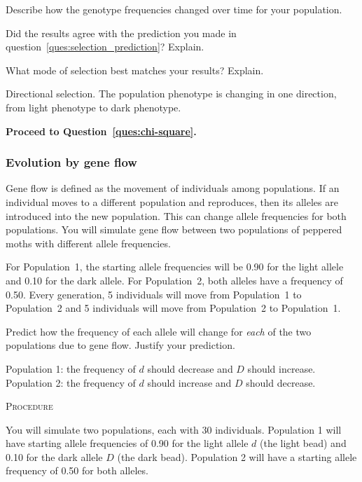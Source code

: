 \documentclass[12pt, hidelinks]{exam}
\newcommand*\AnswerBox[2]{%
    \parbox[t][#1]{0.92\textwidth}{%
    \begin{solution}#2\end{solution}}
    \vspace{\stretch{1}}
}
\newlength{\basespace}
\newcommand{\allele}[1]{$#1$}
\begin{document}
\begin{questions}

\question
Describe how the genotype frequencies changed over time for your population.

\AnswerBox{0.5\basespace}{%
}

\question
Did the results agree with the prediction you made in question~\ref{ques:selection_prediction}? Explain.

\AnswerBox{0.5\basespace}{%
}

\question[Checkout]
What mode of selection best matches your results? Explain.

\AnswerBox{0.5\basespace}{Directional selection. The population phenotype is changing in one direction, from light phenotype to dark phenotype.}

\textbf{Proceed to Question~\ref{ques:chi-square}.}




\subsubsection*{Evolution by gene flow}\label{sec:gene_flow}

Gene flow is defined as the movement of individuals among populations.  If an individual moves to a different population and reproduces, then its alleles are introduced into the new population.  This can change allele frequencies for both populations. You will simulate gene flow between two populations of peppered moths with different allele frequencies. 

For Population~1, the starting allele frequencies will be 0.90 for the light allele and 0.10 for the dark allele. For Population~2, both alleles have a frequency of 0.50. Every generation, 5 individuals will move from Population~1 to Population~2 and 5 individuals will move from Population~2 to Population~1.

\question\label{ques:migration_prediction}
Predict how the frequency of each allele will change for \emph{each} of the two populations due to gene flow. Justify your prediction.

\AnswerBox{3\baselineskip}{Population 1: the frequency of \allele{d} should decrease and \allele{D} should increase. Population 2: the frequency of \allele{d} should increase and \allele{D} should decrease.}

\textsc{Procedure}

\medskip

You will simulate two populations, each with 30 individuals. Population 1 will have starting allele frequencies of 0.90 for the light allele \allele{d} (the light bead) and 0.10 for the dark allele \allele{D} (the dark bead). Population 2 will have a starting allele frequency of 0.50 for both alleles. 


\end{questions}
\end{document}
